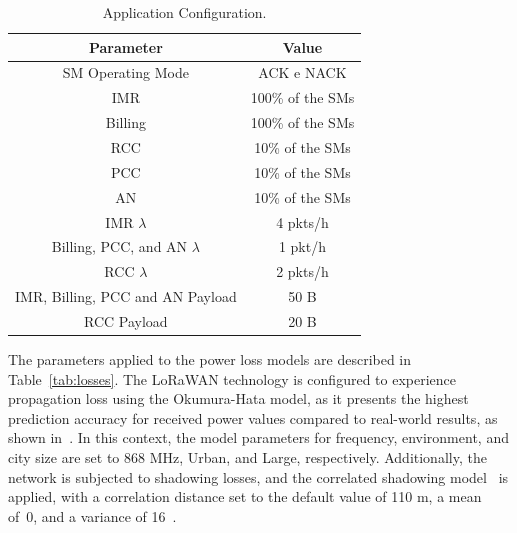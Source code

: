 \documentclass[a4paper,fleqn]{cas-dc}
\begin{document}
\begin{table}[ht]
    \centering
    \caption{Application Configuration.}
    \begin{tabular}{cc}
        \hline \hline 
        Parameter & Value \\ \hline
        SM Operating Mode & \gls{ACK} e \gls{NACK} \\
        IMR & 100\% of the \gls{SMs} \\
        Billing & 100\% of the \gls{SMs} \\
        RCC & 10\% of the \gls{SMs} \\ 
        PCC & 10\% of the \gls{SMs} \\ 
        AN & 10\% of the \gls{SMs} \\ 
        IMR \( \lambda \)  & 4 pkts/h \\
        Billing, PCC, and AN \( \lambda \) & 1 pkt/h \\
        RCC \( \lambda \) & 2 pkts/h \\
        IMR, Billing, PCC and AN Payload & 50 B \\
        RCC Payload & 20 B \\ \hline \hline
    \end{tabular}
    \label{tab:app_confs}
\end{table}

The parameters applied to the power loss models are described in Table~\ref{tab:losses}. The \gls{LoRaWAN} technology is configured to experience propagation loss using the Okumura-Hata model, as it presents the highest prediction accuracy for received power values compared to real-world results, as shown in~\cite{harinda2019comparative, ingabire2020performance}. In this context, the model parameters for frequency, environment, and city size are set to 868 MHz, Urban, and Large, respectively. Additionally, the network is subjected to shadowing losses, and the correlated shadowing model~\cite{magrin2020lora} is applied, with a correlation distance set to the default value of 110 m, a mean of~0, and a variance of 16~\cite{magrin2020lora}.
\end{document}
